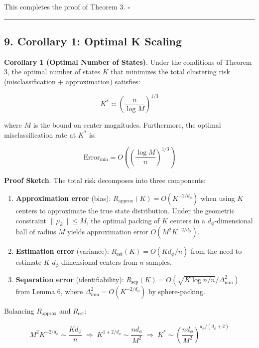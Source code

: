 \documentclass[
  12pt,
]{article}
\begin{document}
This completes the proof of Theorem 3. \(\square\)

\begin{center}\rule{0.5\linewidth}{0.5pt}\end{center}

\subsection{9. Corollary 1: Optimal K
Scaling}\label{corollary-1-optimal-k-scaling}

\textbf{Corollary 1 (Optimal Number of States)}. Under the conditions of
Theorem 3, the optimal number of states \(K\) that minimizes the total
clustering risk (misclassification + approximation) satisfies:

\[K^* \asymp \left(\frac{n}{\log M}\right)^{1/3}\]

where \(M\) is the bound on center magnitudes. Furthermore, the optimal
misclassification rate at \(K^*\) is:

\[\text{Error}_{\min} = O\left(\left(\frac{\log M}{n}\right)^{1/3}\right)\]

\textbf{Proof Sketch}. The total risk decomposes into three components:

\begin{enumerate}
\def\labelenumi{\arabic{enumi}.}
\item
  \textbf{Approximation error} (bias):
  \(R_{\text{approx}}(K) = O(K^{-2/d_\phi})\) when using \(K\) centers
  to approximate the true state distribution. Under the geometric
  constraint \(\|\mu_k\| \leq M\), the optimal packing of \(K\) centers
  in a \(d_\phi\)-dimensional ball of radius \(M\) yields approximation
  error \(O(M^2 K^{-2/d_\phi})\).
\item
  \textbf{Estimation error} (variance):
  \(R_{\text{est}}(K) = O(K d_\phi / n)\) from the need to estimate
  \(K\) \(d_\phi\)-dimensional centers from \(n\) samples.
\item
  \textbf{Separation error} (identifiability):
  \(R_{\text{sep}}(K) = O(\sqrt{K \log n / n} / \Delta_{\min}^2)\) from
  Lemma 6, where \(\Delta_{\min}^2 = O(K^{-2/d_\phi})\) by
  sphere-packing.
\end{enumerate}

Balancing \(R_{\text{approx}}\) and \(R_{\text{est}}\):

\[M^2 K^{-2/d_\phi} \sim \frac{K d_\phi}{n} \;\Longrightarrow\; K^{1 + 2/d_\phi} \sim \frac{n d_\phi}{M^2} \;\Longrightarrow\; K^* \sim \left(\frac{n d_\phi}{M^2}\right)^{d_\phi/(d_\phi + 2)}\]
\end{document}
